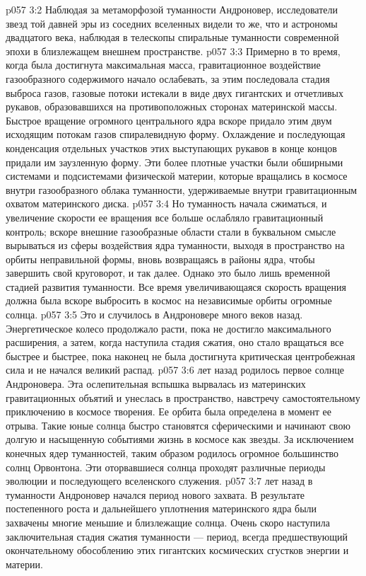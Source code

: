 \vs p057 3:2 Наблюдая за метаморфозой туманности Андроновер, исследователи звезд той давней эры из соседних вселенных видели то же, что и астрономы двадцатого века, наблюдая в телескопы спиральные туманности современной эпохи в близлежащем внешнем пространстве.
\vs p057 3:3 Примерно в то время, когда была достигнута максимальная масса, гравитационное воздействие газообразного содержимого начало ослабевать, за этим последовала стадия выброса газов, газовые потоки истекали в виде двух гигантских и отчетливых рукавов, образовавшихся на противоположных сторонах материнской массы. Быстрое вращение огромного центрального ядра вскоре придало этим двум исходящим потокам газов спиралевидную форму. Охлаждение и последующая конденсация отдельных участков этих выступающих рукавов в конце концов придали им заузленную форму. Эти более плотные участки были обширными системами и подсистемами физической материи, которые вращались в космосе внутри газообразного облака туманности, удерживаемые внутри гравитационным охватом материнского диска.
\vs p057 3:4 Но туманность начала сжиматься, и увеличение скорости ее вращения все больше ослабляло гравитационный контроль; вскоре внешние газообразные области стали в буквальном смысле вырываться из сферы воздействия ядра туманности, выходя в пространство на орбиты неправильной формы, вновь возвращаясь в районы ядра, чтобы завершить свой круговорот, и так далее. Однако это было лишь временной стадией развития туманности. Все время увеличивающаяся скорость вращения должна была вскоре выбросить в космос на независимые орбиты огромные солнца.
\vs p057 3:5 Это и случилось в Андроновере много веков назад. Энергетическое колесо продолжало расти, пока не достигло максимального расширения, а затем, когда наступила стадия сжатия, оно стало вращаться все быстрее и быстрее, пока наконец не была достигнута критическая центробежная сила и не начался великий распад.
\vs p057 3:6 \pc {} лет назад родилось первое солнце Андроновера. Эта ослепительная вспышка вырвалась из материнских гравитационных объятий и унеслась в пространство, навстречу самостоятельному приключению в космосе творения. Ее орбита была определена в момент ее отрыва. Такие юные солнца быстро становятся сферическими и начинают свою долгую и насыщенную событиями жизнь в космосе как звезды. За исключением конечных ядер туманностей, таким образом родилось огромное большинство солнц Орвонтона. Эти оторвавшиеся солнца проходят различные периоды эволюции и последующего вселенского служения.
\vs p057 3:7 \pc {} лет назад в туманности Андроновер начался период нового захвата. В результате постепенного роста и дальнейшего уплотнения материнского ядра были захвачены многие меньшие и близлежащие солнца. Очень скоро наступила заключительная стадия сжатия туманности --- период, всегда предшествующий окончательному обособлению этих гигантских космических сгустков энергии и материи.

